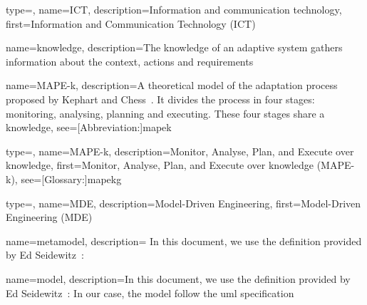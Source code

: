 {
	type=\acronymtype,
	name={ICT},
	description={Information and communication technology},
	first={Information and Communication Technology (ICT)}
}

{
	name={knowledge},
	description={The knowledge of an adaptive system gathers information about the \gls{context}, \glspl{action} and \glspl{requirement}}
}

{
	name={MAPE-k},
    description={A theoretical model of the adaptation process proposed by Kephart and Chess~\cite{DBLP:journals/computer/KephartC03}. It divides the process in four stages: monitoring, analysing, planning and executing. These four stages share a \gls{knowledge}},
    see=[Abbreviation:]{mapek}
}

{
	type=\acronymtype, 
	name={MAPE-k}, 
	description={Monitor, Analyse, Plan, and Execute over knowledge}, 
	first={Monitor, Analyse, Plan, and Execute over knowledge (MAPE-k)}, 
	see=[Glossary:]{mapekg}
}

{
	type=\acronymtype, 
	name={MDE},
	description={Model-Driven Engineering},
	first={Model-Driven Engineering (MDE)}
}

{
	name={metamodel},
	description={
In this document, we use the definition provided by Ed Seidewitz~\cite{DBLP:journals/software/Seidewitz03}: }
}

{
	name={model},
	description={In this document, we use the definition provided by Ed Seidewitz~\cite{DBLP:journals/software/Seidewitz03}:  In our case, the model follow the \gls{uml} specification~\cite{omg2017umlspec}}
}

